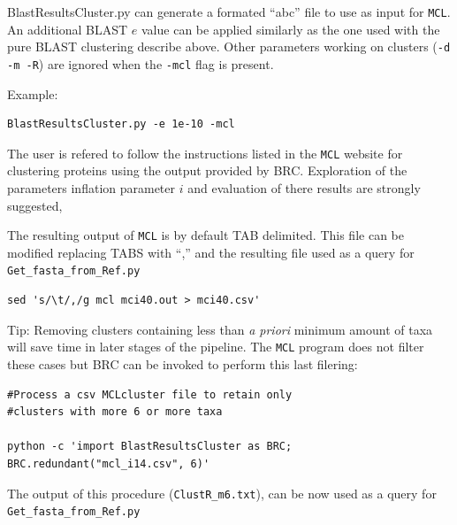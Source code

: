 \documentclass[10pt]{article}
\begin{document}
BlastResultsCluster.py can generate a formated ``abc'' file to use as
input for \texttt{MCL}.  An additional BLAST $e$ value can be applied similarly
as the one used with the pure BLAST clustering describe above. Other
parameters working on clusters (\texttt{-d -m -R}) are ignored when
the \texttt{-mcl} flag is present.

Example:
\begin{verbatim} 
BlastResultsCluster.py -e 1e-10 -mcl
\end{verbatim}

The user is refered to follow the instructions listed in the \texttt{MCL}
website for clustering proteins using the output provided by
BRC. Exploration of the parameters inflation parameter $i$ and
evaluation of there results are strongly suggested,

The resulting output of \texttt{MCL} is by default TAB delimited. This file can
be modified replacing TABS with ``,'' and the resulting file used as a
query for \texttt{Get\_fasta\_from\_Ref.py}

\begin{verbatim} 
sed 's/\t/,/g mcl mci40.out > mci40.csv'
\end{verbatim}

Tip: Removing clusters containing less than \emph{a priori} minimum
amount of taxa will save time in later stages of the pipeline. The \texttt{MCL}
program does not filter these cases but BRC can be invoked to perform
this last filering:

\begin{verbatim} 
#Process a csv MCLcluster file to retain only
#clusters with more 6 or more taxa

python -c 'import BlastResultsCluster as BRC; BRC.redundant("mcl_i14.csv", 6)'

\end{verbatim} 

The output of this procedure (\texttt{ClustR\_m6.txt}),
can be now used as a query for \texttt{Get\_fasta\_from\_Ref.py}
\end{document}
